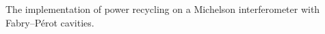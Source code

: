 \label{figure:Michelsons2a}
The implementation of power recycling on a
    Michelson interferometer with Fabry--P\'{e}rot cavities.
